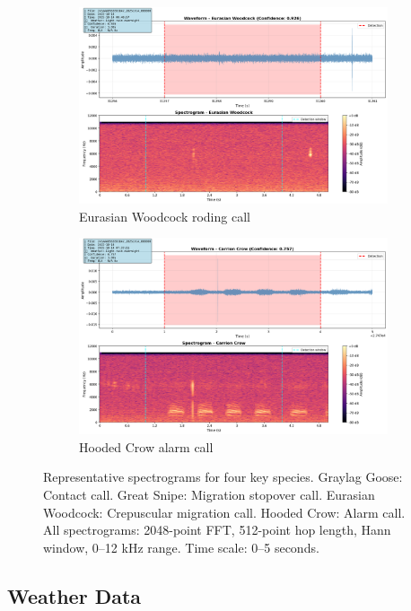 \documentclass[twocolumn]{article}
\begin{document}
\begin{figure}[H]
\begin{subfigure}{0.45\textwidth}
\includegraphics[width=\textwidth]{figures/spectrogram_woodcock.png}
\caption{Eurasian Woodcock roding call}
\end{subfigure}
\hfill
\begin{subfigure}{0.45\textwidth}
\includegraphics[width=\textwidth]{figures/spectrogram_crow.png}
\caption{Hooded Crow alarm call}
\end{subfigure}

\caption{Representative spectrograms for four key species. Graylag Goose: Contact call. Great Snipe: Migration stopover call. Eurasian Woodcock: Crepuscular migration call. Hooded Crow: Alarm call. All spectrograms: 2048-point FFT, 512-point hop length, Hann window, 0--12 kHz range. Time scale: 0--5 seconds.}
\label{fig:spectrograms}
\end{figure}

\subsection{Weather Data}
\end{document}
